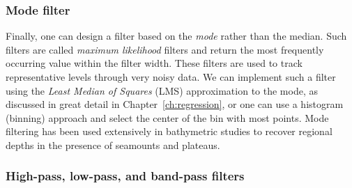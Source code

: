 \subsubsection{Mode filter}
	Finally, one can design a filter based on the \emph{mode} rather than the median. Such filters
are called \emph{maximum likelihood} filters and return the most frequently occurring value
within the filter width. These filters are used to track representative levels through very noisy
data. We can implement such a filter using the \emph{Least Median of Squares} (LMS) approximation to the mode, as
discussed in great detail in Chapter~\ref{ch:regression}, or one can use a histogram (binning) approach and select the center
of the bin with most points.  Mode filtering has been used extensively in bathymetric studies to recover regional depths in the
presence of seamounts and plateaus.


\subsubsection{High-pass, low-pass, and band-pass filters}

